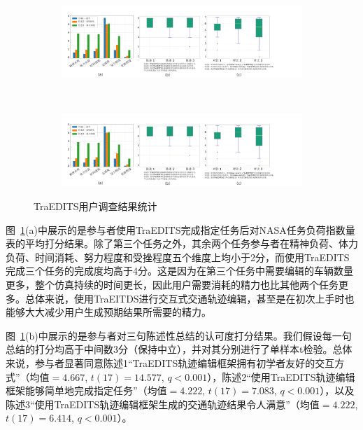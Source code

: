 \begin{figure}[!htb]
\centering
    \begin{subfigure}{0.5\textwidth}
        \includegraphics[width=\textwidth]{figure/traedits/userstudy cn 1.pdf}
    \end{subfigure}
    \\
    \begin{subfigure}{\textwidth}
        \includegraphics[width=\textwidth]{figure/traedits/userstudy cn 4.pdf}
    \end{subfigure}
    
    \caption[TraEDITS用户调查结果统计]{
    TraEDITS用户调查结果统计
    }
    \label{fig:traedits_userstudy}
\end{figure}


图~\ref{fig:traedits_userstudy}(a)中展示的是参与者使用TraEDITS完成指定任务后对NASA任务负荷指数量表的平均打分结果。除了第三个任务之外，其余两个任务参与者在精神负荷、体力负荷、时间消耗、努力程度和受挫程度五个维度上均小于2分，而使用TraEDITS完成三个任务的完成度均高于4分。这是因为在第三个任务中需要编辑的车辆数量更多，整个仿真持续的时间更长，因此用户需要消耗的精力也比其他两个任务更多。总体来说，使用TraEITDS进行交互式交通轨迹编辑，甚至是在初次上手时也能够大大减少用户生成预期结果所需要的精力。

图~\ref{fig:traedits_userstudy}(b)中展示的是参与者对三句陈述性总结的认可度打分结果。我们假设每一句总结的打分均高于中间数3分（保持中立），并对其分别进行了单样本t检验。总体来说，参与者显著同意陈述1“TraEDITS轨迹编辑框架拥有初学者友好的交互方式”（均值$=4.667$, $t(17)=14.577$, $q<0.001$），陈述2“使用TraEDITS轨迹编辑框架能够简单地完成指定任务”（均值$=4.222$, $t(17)=7.083$, $q<0.001$），以及陈述3“使用TraEDITS轨迹编辑框架生成的交通轨迹结果令人满意”（均值$=4.222$, $t(17)=6.414$, $q<0.001$）。


